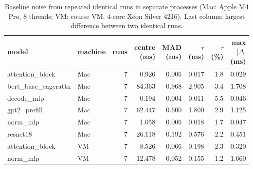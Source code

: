 \begin{table}[h]\centering\scriptsize
\begin{tabular}{llrrrrrr}\toprule
model & machine & runs & centre (ms) & MAD (ms) & $\tau$ (ms) & $\tau$ (\%) & max $|\Delta|$ (ms) \\\midrule
attention\_block & Mac & 7 & 0.926 & 0.006 & 0.017 & 1.8 & 0.029 \\
bert\_base\_eagerattn & Mac & 7 & 84.363 & 0.968 & 2.905 & 3.4 & 1.708 \\
decode\_mlp & Mac & 7 & 0.194 & 0.004 & 0.011 & 5.5 & 0.046 \\
gpt2\_prefill & Mac & 7 & 62.447 & 0.600 & 1.800 & 2.9 & 1.125 \\
norm\_mlp & Mac & 7 & 1.058 & 0.006 & 0.018 & 1.7 & 0.047 \\
resnet18 & Mac & 7 & 26.118 & 0.192 & 0.576 & 2.2 & 0.451 \\
attention\_block & VM & 7 & 8.526 & 0.066 & 0.198 & 2.3 & 0.320 \\
norm\_mlp & VM & 7 & 12.478 & 0.052 & 0.155 & 1.2 & 1.660 \\
\bottomrule\end{tabular}
\caption{Baseline noise from repeated identical runs in separate processes (Mac: Apple M4 Pro, 8 threads; VM: course VM, 4-core Xeon Silver 4216). Last column: largest difference between two identical runs.}\label{tab:noise}
\end{table}%
